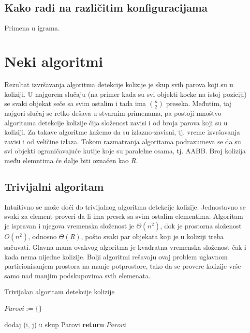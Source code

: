 \documentclass[a4paper]{article}
\begin{document}
{\subsection{Kako radi na različitim konfiguracijama}
Primena u igrama.

\section{Neki algoritmi}
\label{sec:algoritmi}

Rezultat izvršavanja algoritma detekcije kolizije je skup svih parova koji su u koliziji.
U najgorem slučaju (na primer kada su svi objekti kocke na istoj poziciji) se svaki objekat
seče sa svim ostalim i tada ima $ {n\choose 2}  $ preseka. Međutim, taj najgori slučaj se retko dešava
u stvarnim primenama, pa postoji mnoštvo algoritama detekcije kolizije čija složenost zavisi i od broja
parova koji su u koliziji. Za takave algoritme kažemo da su izlazno-zavisni, tj.
vreme izvršavanja zavisi i od veličine izlaza. Tokom razmatranja algoritama podrazumeva se da su svi
objekti ograničavajuće kutije koje su paralelne osama, tj. AABB.
Broj kolizija među elemntima će dalje biti označen kao $R$. 

\subsection{Trivijalni algoritam}
\label{subsec:octree}

Intuitivno se može doći do trivijalnog algoritma detekcije kolizije. 
Jednostavno se svaki za element proveri da li ima presek sa svim ostalim elementima.
Algoritam je ispravan i njegova vremenska složenost je $\Theta (n^2) $, dok je prostorna složenost
$O(n^2)$, odnosno $\Theta(R)$, pošto svaki par objekata koji je u koliziji treba sačuvati.
Glavna mana ovakvog algoritma je kvadratna vremenska složenost čak i kada nema nijedne kolizije.
Bolji algoritmi rešavaju ovaj problem uglavnom particionisanjem prostora na manje potprostore, tako da
se provere kolizije vrše samo nad manjim podskupovima svih elemenata.

\begin{algorithm}
	\caption{Trivijalan algoritam detekcije kolizije}
    \label{alg:triv}
	\begin{algorithmic}[1]
		\State $Parovi := \{ \}$

				\State dodaj (i, j) u skup Parovi
			\EndIf		
		\EndFor
		\EndFor
		\State \textbf{return} $Parovi$
		\EndProcedure
    \end{algorithmic}
\end{algorithm}

}
\end{document}
